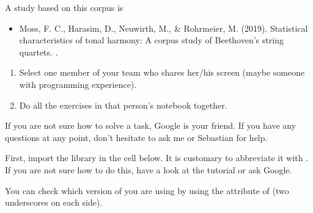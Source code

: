 \documentclass[letterpaper,10pt,english]{sphinxmanual}
\begin{document}
A study based on this corpus is
\begin{itemize}
\item {} 
Moss, F. C., Harasim, D., Neuwirth, M., \& Rohrmeier, M. (2019). Statistical characteristics of tonal harmony: A corpus study of Beethoven’s string quartets. . 

\end{itemize}

\begin{enumerate}
%
\item {} 
Select one member of your team who shares her/his screen (maybe someone with  programming experience).

\item {} 
Do all the exercises in that person’s notebook together.

\end{enumerate}

If you are not sure how to solve a task, Google is your friend. If you have any questions at any point, don’t hesitate to ask me or Sebastian for help.

First, import the  library in the cell below. It is customary to abbreviate it with . If you are not sure how to do this, have a look at the  tutorial or ask Google.

{
\begin{sphinxVerbatim}[commandchars=\\\{\}]
\llap{\color{nbsphinxin}[1]:\,\hspace{\fboxrule}\hspace{\fboxsep}}   
\end{sphinxVerbatim}
}

You can check which version of  you are using by using the  attribute of (two underscores on each side).

{
\begin{sphinxVerbatim}[commandchars=\\\{\}]
\llap{\color{nbsphinxin}[ ]:\,\hspace{\fboxrule}\hspace{\fboxsep}}
\end{sphinxVerbatim}
}
\end{document}
